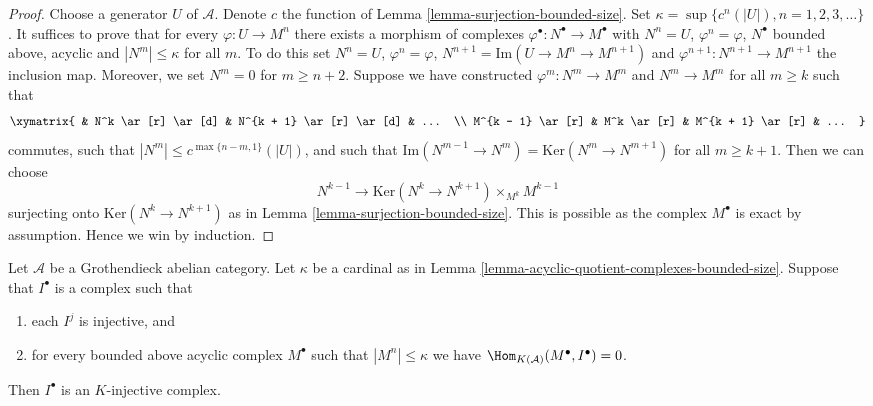 \begin{proof}
Choose a generator $U$ of $\mathcal{A}$. Denote $c$ the function of
Lemma \ref{lemma-surjection-bounded-size}.
Set $\kappa = \sup \{c^n(|U|), n = 1, 2, 3, \ldots\}$.
It suffices to prove that for every $\varphi : U \to M^n$
there exists a morphism of complexes
$\varphi^\bullet : N^\bullet \to M^\bullet$ with
$N^n = U$, $\varphi^n = \varphi$, $N^\bullet$ bounded above, acyclic
and $|N^m| \leq \kappa$ for all $m$. To do this set $N^n = U$,
$\varphi^n = \varphi$, $N^{n + 1} = \text{Im}(U \to M^n \to M^{n + 1})$
and $\varphi^{n + 1} : N^{n + 1} \to M^{n + 1}$ the inclusion map.
Moreover, we set $N^m = 0$ for $m \geq n + 2$.
Suppose we have constructed $\varphi^m : N^m \to M^m$ and
$N^m \to M^m$ for all $m \geq k$ such that
$$
\xymatrix{
& N^k \ar[r] \ar[d] & N^{k + 1} \ar[r] \ar[d] & ... \\
M^{k - 1} \ar[r] & M^k \ar[r] & M^{k + 1} \ar[r] & ...
}
$$
commutes, such that $|N^m| \leq c^{\max\{n - m, 1\}}(|U|)$, and such that
$\text{Im}(N^{m - 1} \to N^m) = \text{Ker}(N^m \to N^{m + 1})$ for
all $m \geq k + 1$. Then we can choose
$$
N^{k - 1} \longrightarrow \text{Ker}(N^k \to N^{k + 1}) \times_{M^k} M^{k - 1}
$$
surjecting onto $\text{Ker}(N^k \to N^{k + 1})$ as in
Lemma \ref{lemma-surjection-bounded-size}. This is possible as
the complex $M^\bullet$ is exact by assumption. Hence we win by induction.
\end{proof}

\begin{lemma}
\label{lemma-characterize-K-injective}
Let $\mathcal{A}$ be a Grothendieck abelian category.
Let $\kappa$ be a cardinal as in
Lemma \ref{lemma-acyclic-quotient-complexes-bounded-size}.
Suppose that $I^\bullet$ is a complex such that
\begin{enumerate}
\item each $I^j$ is injective, and
\item for every bounded above acyclic complex $M^\bullet$
such that $|M^n| \leq \kappa$
we have $\Hom_{K(\mathcal{A})}(M^\bullet, I^\bullet) = 0$.
\end{enumerate}
Then $I^\bullet$ is an $K$-injective complex.
\end{lemma}

